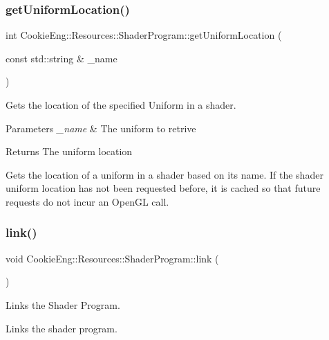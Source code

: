 \subsubsection{\texorpdfstring{get\+Uniform\+Location()}{getUniformLocation()}}
{\footnotesize\ttfamily int Cookie\+Eng\+::\+Resources\+::\+Shader\+Program\+::get\+Uniform\+Location (\begin{DoxyParamCaption}\item[{const std\+::string \&}]{\+\_\+name }\end{DoxyParamCaption})}



Gets the location of the specified Uniform in a shader. 


\begin{DoxyParams}{Parameters}
{\em \+\_\+name} & The uniform to retrive \\
\hline
\end{DoxyParams}
\begin{DoxyReturn}{Returns}
The uniform location
\end{DoxyReturn}
Gets the location of a uniform in a shader based on its name. If the shader uniform location has not been requested before, it is cached so that future requests do not incur an Open\+GL call. \mbox{\label{class_cookie_eng_1_1_resources_1_1_shader_program_ac1c103a1f174c4053a94b65e4f32ccfc}} 
\subsubsection{\texorpdfstring{link()}{link()}}
{\footnotesize\ttfamily void Cookie\+Eng\+::\+Resources\+::\+Shader\+Program\+::link (\begin{DoxyParamCaption}{ }\end{DoxyParamCaption})}



Links the Shader Program. 

Links the shader program. \mbox{\label{class_cookie_eng_1_1_resources_1_1_shader_program_af298d334a9c678b7e1c8e32403a91d92}} 
